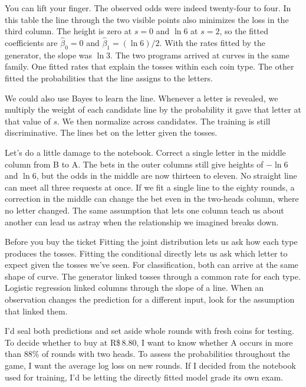 You can lift your finger. The observed odds were indeed twenty-four to four. In this table the line through the two visible points also minimizes the loss in the third column. The height is zero at $s=0$ and $\ln 6$ at $s=2$, so the fitted coefficients are $\widehat\beta_0=0$ and $\widehat\beta_1=(\ln 6)/2$. With the rates fitted by the generator, the slope was $\ln 3$. The two programs arrived at curves in the same family. One fitted rates that explain the tosses within each coin type. The other fitted the probabilities that the line assigns to the letters.

We could also use Bayes to learn the line. Whenever a letter is revealed, we multiply the weight of each candidate line by the probability it gave that letter at that value of $s$. We then normalize across candidates. The training is still discriminative. The lines bet on the letter given the tosses.

Let's do a little damage to the notebook. Correct a single letter in the middle column from B to A. The bets in the outer columns still give heights of $-\ln 6$ and $\ln 6$, but the odds in the middle are now thirteen to eleven. No straight line can meet all three requests at once. If we fit a single line to the eighty rounds, a correction in the middle can change the bet even in the two-heads column, where no letter changed. The same assumption that lets one column teach us about another can lead us astray when the relationship we imagined breaks down.

\begin{quadro}{Before you buy the ticket}
 Fitting the joint distribution lets us ask how each type produces the tosses. Fitting the conditional directly lets us ask which letter to expect given the tosses we've seen. For classification, both can arrive at the same shape of curve.
 The generator linked tosses through a common rate for each type. Logistic regression linked columns through the slope of a line. When an observation changes the prediction for a different input, look for the assumption that linked them.
\end{quadro}

I'd seal both predictions and set aside whole rounds with fresh coins for testing. To decide whether to buy at R\$\,8.80, I want to know whether A occurs in more than $88\%$ of rounds with two heads. To assess the probabilities throughout the game, I want the average log loss on new rounds. If I decided from the notebook used for training, I'd be letting the directly fitted model grade its own exam.

